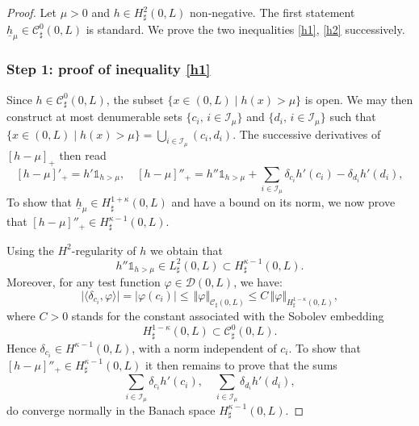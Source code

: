 \documentclass[JEP,XML,SOM,Unicode,NoFloatCountersInSection]{cedram}
\let\mathcal\mathscr
\theoremstyle{remark}
\theoremstyle{definition}
\newcommand{\norme}[1]{\,\Vert #1\Vert}
\newcommand{\hb}{{\underline{h}}}
\begin{document}
\begin{proof}Let $\mu>0$ and $h \in H^{2}_{\sharp}(0,L)$ non-negative. The first statement $\hb_{\mu}\in \mathcal{C}_\sharp^{0}(0,L)$ is standard. We prove the two inequalities \eqref{h1}, \eqref{h2} successively.

\subsubsection*{Step 1: proof of inequality \eqref{h1}}
Since $h \!\in\!{\mathcal C}^0_{\sharp}(0,L)$, the subset \hbox{$\{x\!\in\!(0, L)\mid h(x)\!>\!\mu\}$} is open.
We may then construct at most denumerable sets $\{c_i, \, i\!\in\!\mathcal I_{\mu}\}$ and \hbox{$\{ d_i, \, i\!\in\!\mathcal I_{\mu}\}$} such that $\{x\!\in\!(0, L)\mid h(x)\!>\!\mu\}\!=\! \bigcup_{i\in\mathcal I_{\mu}}(c_{i},d_{i})$. The successive derivatives of $[h-\mu]_{+}$ then read
\[
[h-\mu]'_{+}= h'\mathds{1}_{h>\mu}, \quad [h-\mu]{''}_{+}= h{''}\mathds{1}_{h>\mu}+\sum_{i\in \mathcal I_{\mu}}\delta_{c_{i} }h{'}(c_{i})- \delta_{d_{i}}h'(d_{i}),
\]
To show that $\hb_{\mu} \in H^{1+\kappa}_{\sharp}(0,L)$ and have a bound on its norm, we now prove that
$[h- {\mu}]{''}_{+} \in H^{\kappa-1}_{\sharp}(0,L)$.

Using the $H^{2}$-regularity of $h$ we obtain that
\[
h{''}\mathds{1}_{h>\mu} \in L_\sharp^{2}(0,L) \subset H^{\kappa-1}_{\sharp}(0,L).
\]
Moreover, for any test function $\varphi \in \mathcal{D}(0, L)$, we have:
\[
\vert\langle \delta_{c_{i}},\varphi\rangle\vert = \vert \varphi(c_{i})\vert\leq \norme{\varphi}_{\mathcal{C}_\sharp(0,L)}\leq C\norme{\varphi}_{H_\sharp^{1-\kappa}(0,L)},
\]
where $C>0$ stands for the constant associated with the Sobolev embedding
\[
H_\sharp^{1-\kappa}(0,L) \subset \mathcal{C}^0_\sharp(0,L).
\]
Hence $\delta_{c_{i}} \in H^{\kappa-1}(0,L)$, with a norm independent of $c_{i}$. To show that $[h- {\mu}]{''}_{+} \in H^{\kappa-1}_{\sharp}(0,L)$ it then remains to prove that the sums
\[
\sum_{i\in \mathcal I_{\mu}}\delta_{c_{i} }h{'}(c_{i}), \quad \sum_{i\in \mathcal I_{\mu}}\delta_{d_{i} }h{'}(d_{i}),
\]
do converge normally in the Banach space $H_\sharp^{\kappa-1}(0,L)$.


\end{proof}
\end{document}
